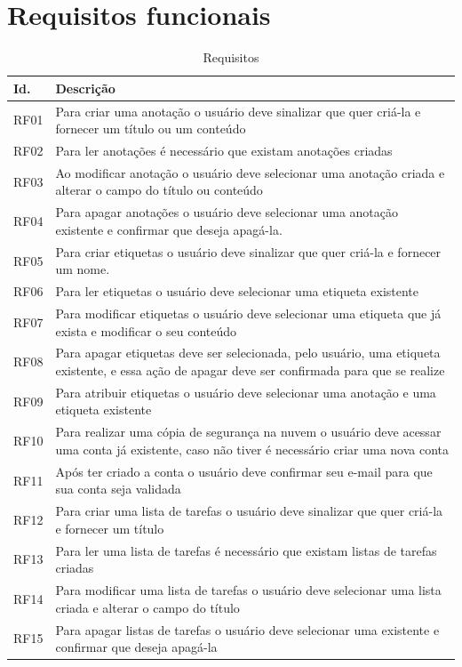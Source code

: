 \documentclass[
	12pt,				%
	oneside,			%
	a4paper,			%
	english,			%
	brazil,				%
	]{abntex2}
\begin{document}
\section{Requisitos funcionais}
\IBGEtabfontsize
\begin{longtable}{@{}p{}p{}@{}}
\caption{Requisitos}
\label{tab:requisitos} \\
\toprule
\textbf{Id.} & \textbf{Descrição} \\ \midrule
RF01 & Para criar uma anotação o usuário deve sinalizar que quer criá-la e fornecer um título ou um conteúdo \\ \midrule
RF02 & Para ler anotações é necessário que existam anotações criadas \\ \midrule
RF03 & Ao modificar anotação o usuário deve selecionar uma anotação criada e alterar o campo do título ou conteúdo   \\ \midrule
RF04 & Para apagar anotações o usuário deve selecionar uma anotação existente e confirmar que deseja apagá-la. \\ \midrule

RF05 & Para criar etiquetas o usuário deve sinalizar que quer criá-la e fornecer um nome. \\ \midrule
RF06 & Para ler etiquetas o usuário deve selecionar uma etiqueta existente \\ \midrule
RF07 & Para modificar etiquetas o usuário deve selecionar uma etiqueta que já exista e modificar o seu conteúdo \\ \midrule
RF08 & Para apagar etiquetas deve ser selecionada, pelo usuário, uma etiqueta existente, e essa ação de apagar deve ser confirmada para que se realize \\ \midrule
RF09 & Para atribuir etiquetas o usuário deve selecionar uma anotação e uma etiqueta existente \\ \midrule

RF10 & Para realizar uma cópia de segurança na nuvem o usuário deve acessar uma conta já existente, caso não tiver é necessário criar uma nova conta  \\ \midrule

RF11 & Após ter criado a conta o usuário deve confirmar seu e-mail para que sua conta seja validada\\ \midrule

RF12 & Para criar uma lista de tarefas o usuário deve sinalizar que quer criá-la e fornecer um título \\ \midrule
RF13 & Para ler uma lista de tarefas é necessário que existam listas de tarefas criadas \\ \midrule
RF14 & Para modificar uma lista de tarefas o usuário deve selecionar uma lista criada e alterar o campo do título \\ \midrule
RF15 & Para apagar listas de tarefas o usuário deve selecionar uma existente e confirmar que deseja apagá-la \\ \midrule


\end{longtable}
\end{document}
